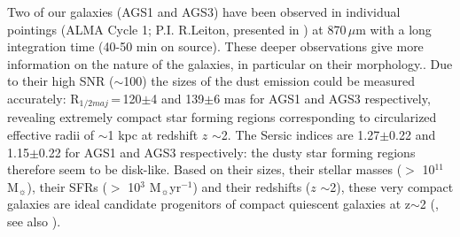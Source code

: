\documentclass[longauth]{aa}
\begin{document}
Two of our galaxies (AGS1 and AGS3) have been observed in individual pointings (ALMA Cycle 1; P.I. R.Leiton, presented in \citealt{Elbaz2017}) at 870\,$\mu$m with a long integration time (40-50 min on source). These deeper observations give more information on the nature of the galaxies, in particular on their morphology.. Due to their high SNR ($\sim$100) the sizes of the dust emission could be measured accurately: R$_{1/2maj}$\,=\,120$\pm$4 and 139$\pm$6 mas for AGS1 and AGS3 respectively, revealing extremely compact star forming regions corresponding to circularized effective radii of $\sim$1 kpc at redshift $z$ $\sim$2. The Sersic indices are 1.27$\pm$0.22 and 1.15$\pm$0.22 for AGS1 and AGS3 respectively: the dusty star forming regions therefore seem to be disk-like. Based on their sizes, their stellar masses ($>$ 10$^{11}$ M$_\sun$), their SFRs ($>$ 10$^{3}$ M$_\sun$yr$^{-1}$) and their redshifts ($z$ $\sim$2), these very compact galaxies are ideal candidate progenitors of compact quiescent galaxies at z$\sim$2 (\citealt{Barro2013,Williams2014,VanderWel2014,Kocevski2017}, see also \citealt{Elbaz2017}). 
\end{document}
